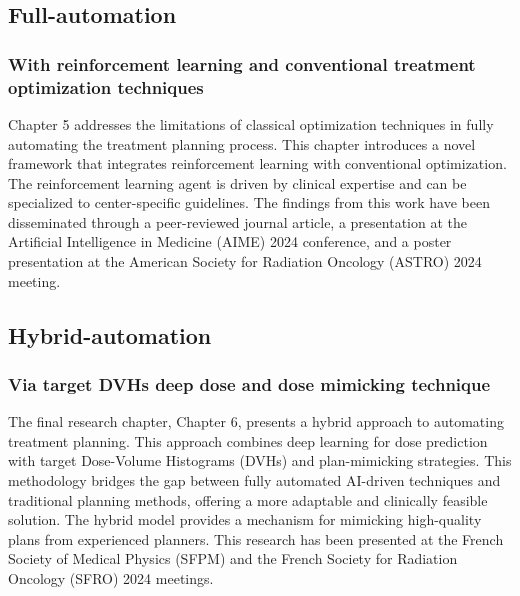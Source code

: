 \subsection{Full-automation}
\subsubsection*{With reinforcement learning and conventional treatment optimization techniques}
Chapter 5 addresses the limitations of classical optimization techniques in fully automating the treatment planning process.
This chapter introduces a novel framework that integrates reinforcement learning with conventional optimization.
The reinforcement learning agent is driven by clinical expertise and can be specialized to center-specific guidelines.
The findings from this work have been disseminated through a peer-reviewed journal article, a presentation at the Artificial Intelligence in Medicine (AIME) 2024 conference, and a poster presentation at the American Society for Radiation Oncology (ASTRO) 2024 meeting.

\subsection{Hybrid-automation}
\subsubsection*{Via target DVHs deep dose and dose mimicking technique}
The final research chapter, Chapter 6, presents a hybrid approach to automating treatment planning.
This approach combines deep learning for dose prediction with target Dose-Volume Histograms (DVHs) and plan-mimicking strategies.
This methodology bridges the gap between fully automated AI-driven techniques and traditional planning methods, offering a more adaptable and clinically feasible solution.
The hybrid model provides a mechanism for mimicking high-quality plans from experienced planners.
This research has been presented at the French Society of Medical Physics (SFPM) and the French Society for Radiation Oncology (SFRO) 2024 meetings.
